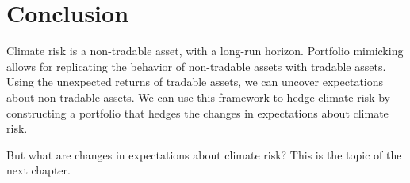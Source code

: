 

 
\section{Conclusion}

Climate risk is a non-tradable asset, with a long-run horizon.
Portfolio mimicking allows for replicating the behavior of
non-tradable assets with tradable assets. Using the unexpected
returns of tradable assets, we can uncover expectations about
non-tradable assets. We can use this framework to hedge
climate risk by constructing a portfolio that hedges
the changes in expectations about climate risk.

But what are changes in expectations about climate risk?
This is the topic of the next chapter.